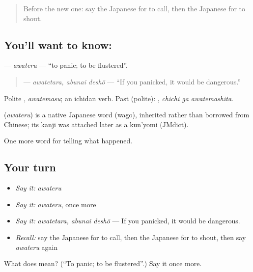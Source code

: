 \begin{quote}
Before the new one: say the Japanese for to call, then the Japanese for to shout.
\end{quote}

\subsection*{You'll want to know: }
\textbf{} — \emph{awateru} — \textquotedblleft{}to panic; to be flustered\textquotedblright{}.

\begin{quote}
\textbf{} — \emph{awatetara, abunai deshō} — \textquotedblleft{}If you panicked, it would be dangerous.\textquotedblright{}
\end{quote}

Polite \textbf{}, \emph{awatemasu}; an ichidan verb. Past (polite): \textbf{ }, \emph{chichi ga awatemashita}.

\begin{cousinweb}
\textbf{} (\emph{awateru}) is a native Japanese word (wago), inherited rather than borrowed from Chinese; its kanji was attached later as a kun'yomi (JMdict).
\end{cousinweb}

\begin{grammarlens}[title={What you've built}]
One more word for telling what happened.
\end{grammarlens}

\subsection*{Your turn}
\begin{itemize}
\raggedright
  \item \emph{Say it:} \emph{awateru}
  \item \emph{Say it:} \emph{awateru}, once more
  \item \emph{Say it:} \emph{awatetara, abunai deshō} — If you panicked, it would be dangerous.
  \item \emph{Recall:} say the Japanese for to call, then the Japanese for to shout, then say \emph{awateru} again
\end{itemize}

\begin{tcolorbox}[breakable,colback=teal!4,colframe=teal!35!black,title={Before you move on}]
What does  mean? (\textquotedblleft{}To panic; to be flustered\textquotedblright{}.) Say it once more.
\end{tcolorbox}
